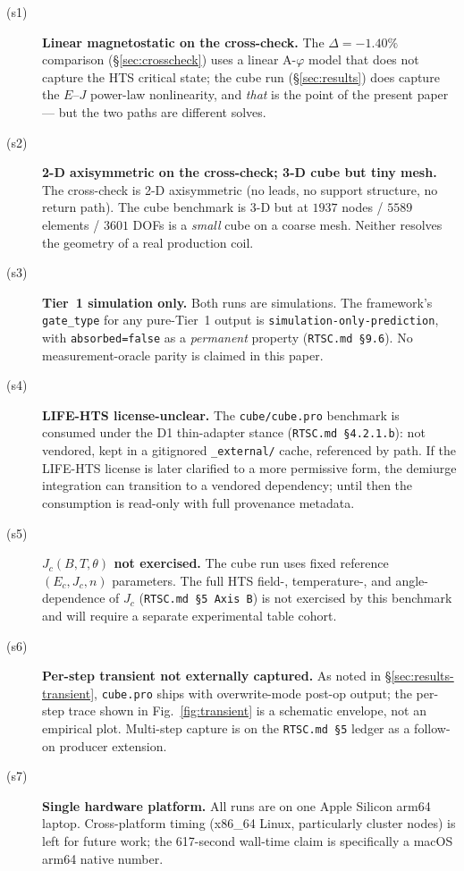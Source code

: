 \documentclass[11pt,a4paper]{article}
\newcommand{\absorbedfalse}{\textcolor{honestred}{\texttt{absorbed=false}}}
\newcommand{\simonly}{\texttt{simulation-only-prediction}}
\begin{document}
\begin{description}
\item[(s1)] \textbf{Linear magnetostatic on the cross-check.} The
$\Delta = -1.40\%$ comparison (\S\ref{sec:crosscheck}) uses a
linear A-$\varphi$ model that does not capture the HTS critical
state; the cube run (\S\ref{sec:results}) does capture the
$E$--$J$ power-law nonlinearity, and \emph{that} is the point of
the present paper --- but the two paths are different solves.

\item[(s2)] \textbf{2-D axisymmetric on the cross-check; 3-D
cube but tiny mesh.} The cross-check is 2-D axisymmetric (no leads,
no support structure, no return path). The cube benchmark is 3-D
but at $1937$ nodes / $5589$ elements / $3601$ DOFs is a
\emph{small} cube on a coarse mesh. Neither resolves the
geometry of a real production coil.

\item[(s3)] \textbf{Tier~1 simulation only.} Both runs are
simulations. The framework's \texttt{gate\_type} for any pure-Tier~1
output is \simonly{}, with \absorbedfalse{} as a
\emph{permanent} property (\texttt{RTSC.md \S9.6}). No
measurement-oracle parity is claimed in this paper.

\item[(s4)] \textbf{LIFE-HTS license-unclear.} The
\texttt{cube/cube.pro} benchmark is consumed under the D1 thin-adapter
stance (\texttt{RTSC.md \S4.2.1.b}): not vendored, kept in a
gitignored \texttt{\_external/} cache, referenced by path. If the
LIFE-HTS license is later clarified to a more permissive form, the
demiurge integration can transition to a vendored dependency; until
then the consumption is read-only with full provenance metadata.

\item[(s5)] \textbf{$J_c(B, T, \theta)$ not exercised.} The cube
run uses fixed reference $(E_c, J_c, n)$ parameters. The full
HTS field-, temperature-, and angle-dependence of $J_c$
(\texttt{RTSC.md \S5 Axis B}) is not exercised by this benchmark and
will require a separate experimental table cohort.

\item[(s6)] \textbf{Per-step transient not externally captured.}
As noted in \S\ref{sec:results-transient}, \texttt{cube.pro} ships
with overwrite-mode post-op output; the per-step trace shown in
Fig.~\ref{fig:transient} is a schematic envelope, not an empirical
plot. Multi-step capture is on the \texttt{RTSC.md \S5} ledger as
a follow-on producer extension.

\item[(s7)] \textbf{Single hardware platform.} All runs are on one
Apple Silicon arm64 laptop. Cross-platform timing (x86\_64 Linux,
particularly cluster nodes) is left for future work; the
617-second wall-time claim is specifically a macOS arm64 native
number.
\end{description}
\end{document}
